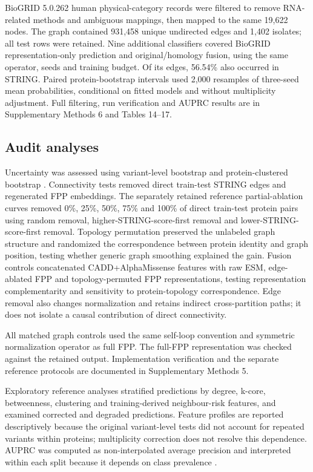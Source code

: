 \documentclass[conference]{IEEEtran}
\newcommand{\CADDAM}{CADD\allowbreak{}+\allowbreak{}AlphaMissense}
\begin{document}
BioGRID 5.0.262 human physical-category records \cite{Stark2006BioGRID} were filtered to remove RNA-related methods and ambiguous mappings, then mapped to the same 19,622 nodes. The graph contained 931,458 unique undirected edges and 1,402 isolates; all test rows were retained. Nine additional classifiers covered BioGRID representation-only prediction and original/homology fusion, using the same operator, seeds and training budget. Of its edges, 56.54\% also occurred in STRING. Paired protein-bootstrap intervals used 2,000 resamples of three-seed mean probabilities, conditional on fitted models and without multiplicity adjustment. Full filtering, run verification and AUPRC results are in Supplementary Methods 6 and Tables 14--17.

\subsection{Audit analyses}

Uncertainty was assessed using variant-level bootstrap and protein-clustered bootstrap \cite{Efron1993Bootstrap}. Connectivity tests removed direct train-test STRING edges and regenerated FPP embeddings. The separately retained reference partial-ablation curves removed 0\%, 25\%, 50\%, 75\% and 100\% of direct train-test protein pairs using random removal, higher-STRING-score-first removal and lower-STRING-score-first removal. Topology permutation preserved the unlabeled graph structure and randomized the correspondence between protein identity and graph position, testing whether generic graph smoothing explained the gain. Fusion controls concatenated \CADDAM{} features with raw ESM, edge-ablated FPP and topology-permuted FPP representations, testing representation complementarity and sensitivity to protein-topology correspondence. Edge removal also changes normalization and retains indirect cross-partition paths; it does not isolate a causal contribution of direct connectivity.

All matched graph controls used the same self-loop convention and symmetric normalization operator as full FPP. The full-FPP representation was checked against the retained output. Implementation verification and the separate reference protocols are documented in Supplementary Methods 5.

Exploratory reference analyses stratified predictions by degree, k-core, betweenness, clustering and training-derived neighbour-risk features, and examined corrected and degraded predictions. Feature profiles are reported descriptively because the original variant-level tests did not account for repeated variants within proteins; multiplicity correction \cite{Benjamini1995FDR} does not resolve this dependence. AUPRC was computed as non-interpolated average precision and interpreted within each split because it depends on class prevalence \cite{Saito2015PrecisionRecall}.
\end{document}

